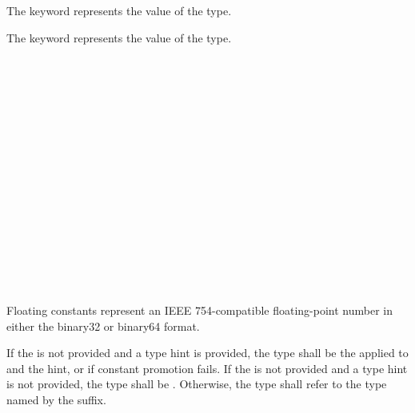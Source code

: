 \specsubsubitem
The  keyword represents the  value of the
 type.

\specsubsubitem
The  keyword represents the  value of the
 type.


\begin{grammar}
 \exactly \\
	     \\
	   \\

 \oneof \\
	 \\

 \exactly \\
	  \\

 \oneof \\
	 \\

 \exactly \\
	   \\

 \oneof \\
        \terminal{+}
        \terminal{-} \\

 \oneof \\
         \\
\end{grammar}

Floating constants represent an IEEE 754-compatible floating-point
number in either the binary32 or binary64 format.

\specsubitem
If the  is not provided and a type hint is
provided, the type shall be the
 applied to 
and the hint, or  if constant promotion fails. If the
 is not provided and a type hint is not provided,
the type shall be . Otherwise, the type shall refer to the type
named by the suffix.

